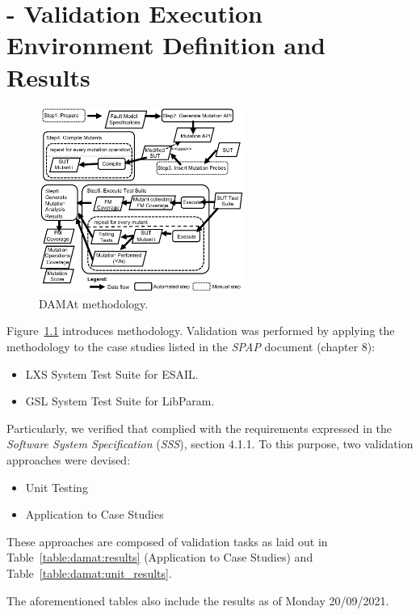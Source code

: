 
\chapter{\DAMA - Validation Execution Environment Definition and Results}

\begin{figure}[h]
  \centering
  \includegraphics[width=0.6\textwidth]{images/dataDrivenBufferProcess.pdf}
      \caption{DAMAt methodology.}
      \label{fig:damat}
\end{figure}

Figure~\ref{fig:damat} introduces \DAMA methodology.
Validation was performed by applying the \DAMA methodology to the case studies listed in the \emph{SPAP} document (chapter 8):
\begin{itemize}
  \item LXS System Test Suite for ESAIL.
  \item GSL System Test Suite for LibParam.
\end{itemize}

\STARTCHANGEDFINAL

Particularly, we verified that \DAMA complied with the requirements expressed in the \emph{Software System Specification} (\emph{SSS}), section 4.1.1.
To this purpose, two validation approaches were devised:
\begin{itemize}
  \item Unit Testing
  \item Application to Case Studies
\end{itemize}

These approaches are composed of validation tasks as laid out in Table~\ref{table:damat:results} (Application to Case Studies) and Table~\ref{table:damat:unit_results}.

The aforementioned tables also include the results as of Monday 20/09/2021.

